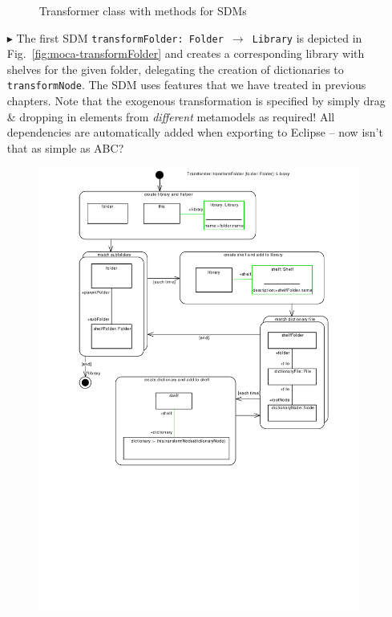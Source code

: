 \begin{enumerate}
\begin{figure}[!htbp]
\begin{center}
  \caption{Transformer class with methods for SDMs}
  \label{fig:moca-DictionaryCodeAdapter}
\end{center}
\end{figure}
\item[$\blacktriangleright$]  The first SDM \texttt{transformFolder:~Folder~$\rightarrow$~Library} is depicted in Fig.~\ref{fig:moca-transformFolder} and creates a corresponding library with shelves for the given folder, delegating the creation of dictionaries to \texttt{transformNode}.
The SDM uses features that we have treated in previous chapters.
Note that the exogenous transformation is specified by simply drag \& dropping in elements from \emph{different} metamodels as required!
All dependencies are automatically added when exporting to Eclipse -- now isn't that as simple as ABC?
\begin{figure}[!htbp]
\begin{center}
 \includegraphics[width=\textwidth]{pics/moca/3MocaTreeToModel/transformFolderPrintPdf}

\end{center}
\end{figure}
\end{enumerate}
